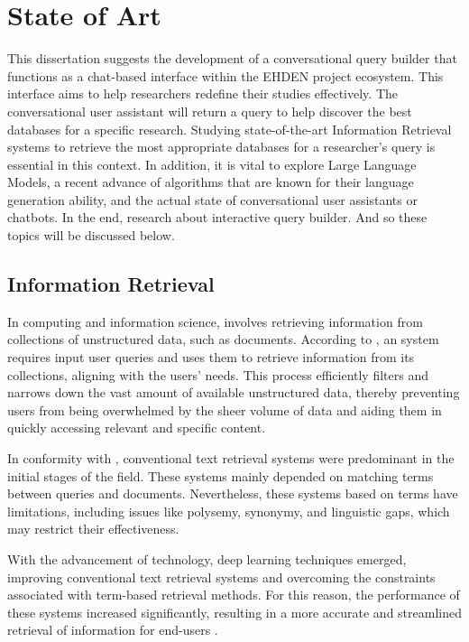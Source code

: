 \chapter{State of Art}
\label{chapter: State of Art}

This dissertation suggests the development of a conversational query builder that functions as a chat-based interface within the EHDEN project ecosystem. This interface aims to help researchers redefine their studies effectively. The conversational user assistant will return a query to help discover the best databases for a specific research. Studying state-of-the-art Information Retrieval systems to retrieve the most appropriate databases for a researcher's query is essential in this context. In addition, it is vital to explore Large Language Models, a recent advance of algorithms that are known for their language generation ability, and the actual state of conversational user assistants or chatbots. In the end, research about interactive query builder. And so these topics will be discussed below.


\section{Information Retrieval}

In computing and information science, {\ir} involves retrieving information from collections of unstructured data, such as documents. According to \citet{p_m_efficient_2021}, an {\ir} system requires input user queries and uses them to retrieve information from its collections, aligning with the users' needs. This process efficiently filters and narrows down the vast amount of available unstructured data, thereby preventing users from being overwhelmed by the sheer volume of data and aiding them in quickly accessing relevant and specific content.

In conformity with \citet{hambarde_information_2023}, conventional text retrieval systems were predominant in the initial stages of the {\ir} field. These systems mainly depended on matching terms between queries and documents. Nevertheless, these systems based on terms have limitations, including issues like polysemy, synonymy, and linguistic gaps, which may restrict their effectiveness.

With the advancement of technology, deep learning techniques emerged, improving conventional text retrieval systems and overcoming the constraints associated with term-based retrieval methods. For this reason, the performance of these systems increased significantly, resulting in a more accurate and streamlined retrieval of information for end-users \cite{hambarde_information_2023}.

